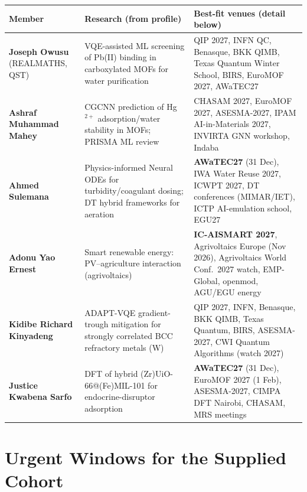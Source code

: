 \documentclass[11pt,a4paper]{article}
\begin{document}
\begin{longtable}{@{}p{3.2cm}p{5.4cm}p{5.3cm}@{}}
\toprule
\textbf{Member} & \textbf{Research (from profile)} & \textbf{Best-fit venues (detail below)} \\
\midrule
\endhead
\textbf{Joseph Owusu} (REALMATHS, QST) & VQE-assisted ML screening of Pb(II) binding in carboxylated MOFs for water purification & QIP 2027, INFN QC, Benasque, BKK QIMB, Texas Quantum Winter School, BIRS, EuroMOF 2027, AWaTEC27 \\
\midrule
\textbf{Ashraf Muhammad Mahey} & CGCNN prediction of Hg$^{2+}$ adsorption/water stability in MOFs; PRISMA ML review & CHASAM 2027, EuroMOF 2027, ASESMA-2027, IPAM AI-in-Materials 2027, INVIRTA GNN workshop, Indaba \\
\midrule
\textbf{Ahmed Sulemana} & Physics-informed Neural ODEs for turbidity/coagulant dosing; DT hybrid frameworks for aeration & \textbf{AWaTEC27} (31 Dec), IWA Water Reuse 2027, ICWPT 2027, DT conferences (MIMAR/IET), ICTP AI-emulation school, EGU27 \\
\midrule
\textbf{Adonu Yao Ernest} & Smart renewable energy: PV--agriculture interaction (agrivoltaics) & \textbf{IC-AISMART 2027}, Agrivoltaics Europe (Nov 2026), Agrivoltaics World Conf.\ 2027 watch, EMP-Global, openmod, AGU/EGU energy \\
\midrule
\textbf{Kidibe Richard Kinyadeng} & ADAPT-VQE gradient-trough mitigation for strongly correlated BCC refractory metals (W) & QIP 2027, INFN, Benasque, BKK QIMB, Texas Quantum, BIRS, ASESMA-2027, CWI Quantum Algorithms (watch 2027) \\
\midrule
\textbf{Justice Kwabena Sarfo} & DFT of hybrid (Zr)UiO-66@(Fe)MIL-101 for endocrine-disruptor adsorption & \textbf{AWaTEC27} (31 Dec), EuroMOF 2027 (1 Feb), ASESMA-2027, CIMPA DFT Nairobi, CHASAM, MRS meetings \\
\bottomrule
\end{longtable}

\section{Urgent Windows for the Supplied Cohort}
\end{document}
